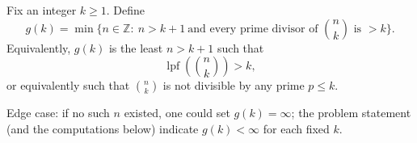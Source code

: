 \smallskip
\noindent
Fix an integer $k\ge 1$. Define
\[
 g(k)=\min\Big\{n\in\mathbb{Z}:\ n>k+1\ \text{and every prime divisor of }\binom{n}{k}\text{ is }>k\Big\}.
\]
Equivalently, $g(k)$ is the least $n>k+1$ such that
\[
\operatorname{lpf}\!\left(\binom{n}{k}\right)>k,
\]
or equivalently such that $\binom{n}{k}$ is not divisible by any prime $p\le k$.

\smallskip
\noindent
Edge case: if no such $n$ existed, one could set $g(k)=\infty$; the problem statement (and the computations below) indicate $g(k)<\infty$ for each fixed $k$.
